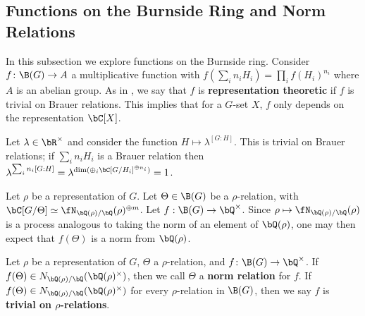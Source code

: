 \subsection{Functions on the Burnside Ring and Norm Relations}\label{sec-norm-rels}

In this subsection we explore functions on the Burnside ring. 
Consider $f \colon \B(G) \to A$ a multiplicative function with $f(\sum_i n_i H_i) = \prod_i f(H_i)^{n_i}$ where $A$ is an abelian group. As in \cite{reg-const}, we say that $f$ is \textbf{representation theoretic} if $f$ is trivial on Brauer relations. This implies that for a $G$-set $X$, $f$ only depends on the representation $\bC[X]$. 

\begin{example}
  Let $\lambda \in \bR^{\times}$ and consider the function $H \mapsto \lambda^{[G : H]}$. This is trivial on Brauer relations;  if $\sum_i n_i H_i$ is a Brauer relation then $\lambda^{\sum_i n_i [G : H]} = \lambda^{\dim( \oplus_i \bC[G / H_i]^{\oplus n_i})} = 1$.
\end{example}

Let $\rho$ be a representation of $G$. Let $\Theta \in \B(G)$ be a $\rho$-relation, with $\bC[G / \Theta] \simeq \repnorm{\rho}^{\oplus m}$. Let $f : \B(G) \to \bQ^{\times}$. Since $\rho \mapsto \repnorm{\rho}$ is a process analogous to taking the norm of an element of $\bQ(\rho)$, one may then expect that $f(\Theta)$ is a norm from $\bQ(\rho)$. 

\begin{defn}
Let $\rho$ be a representation of $G$, $\Theta$ a $\rho$-relation, and $f \colon \B(G) \to \bQ^{\times}$. If $f(\Theta) \in \fieldnorm{\rho}$, then we call $\Theta$ a \textbf{norm relation} for $f$. 
If $f(\Theta) \in \fieldnorm{\rho}$ for every $\rho$-relation in $\B(G)$, then we say $f$ is \textbf{trivial on $\rho$-relations}.

\end{defn}



